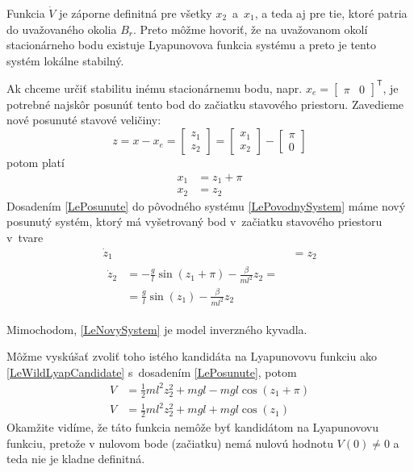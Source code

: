 \documentclass[a4paper, 10pt, ]{article}
\begin{document}
Funkcia $\dot{V}$ je záporne definitná pre všetky $x_2$~a~$x_1$, a teda aj pre tie, ktoré patria do uvažovaného okolia $B_r$. Preto môžme hovoriť, že na uvažovanom okolí stacionárneho bodu existuje Lyapunovova funkcia systému a preto je tento systém lokálne stabilný.





Ak chceme určiť stabilitu inému stacionárnemu bodu, napr. $x_e = \begin{bmatrix} \pi & 0  \end{bmatrix}^\mathsf{T}$, je potrebné najskôr posunúť tento bod do začiatku stavového priestoru. Zavedieme nové posunuté stavové veličiny:
\begin{equation}
	z = x - x_e =
	\begin{bmatrix} z_1 \\ z_2  \end{bmatrix}
	=
	\begin{bmatrix} x_1 \\ x_2  \end{bmatrix}
	-
	\begin{bmatrix} \pi \\ 0  \end{bmatrix}
\end{equation}
potom platí
\begin{subequations} \label{LePosunute}
	\begin{align}
		x_1 &= z_1 + \pi \\
		x_2 &= z_2
	\end{align}
\end{subequations}
Dosadením \eqref{LePosunute} do pôvodného systému \eqref{LePovodnySystem} máme nový posunutý systém, ktorý má vyšetrovaný bod v~začiatku stavového priestoru v~tvare
\begin{subequations} \label{LeNovySystem}
	\begin{align}
		\dot{z}_1  &= z_2 \\
		\begin{split}
			\dot{z}_2  &= -\frac{g}{l} \sin(z_1 + \pi) - \frac{\beta}{ml^2} z_2 =	\\
			&= \frac{g}{l} \sin(z_1) - \frac{\beta}{ml^2} z_2
			\end{split}
	\end{align}
\end{subequations}

Mimochodom, \eqref{LeNovySystem} je model inverzného kyvadla.

Môžme vyskúšať zvoliť toho istého kandidáta na Lyapunovovu funkciu ako \eqref{LeWildLyapCandidate} s~dosadením \eqref{LePosunute}, potom
\begin{subequations}
\begin{align}
		V &= \frac{1}{2} m l^2 z_2^2 + mgl - mgl \cos(z_1 + \pi) \\
		V &= \frac{1}{2} m l^2 z_2^2 + mgl + mgl \cos(z_1)
\end{align}
\end{subequations}
Okamžite vidíme, že táto funkcia nemôže byť kandidátom na Lyapunovovu funkciu, pretože v nulovom bode (začiatku) nemá nulovú hodnotu $V(0) \neq 0$ a teda nie je kladne definitná.
\end{document}
